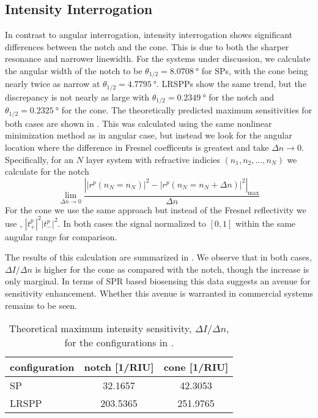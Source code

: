 \subsection{Intensity Interrogation}
In contrast to angular interrogation, intensity interrogation shows
significant differences between the notch and the cone.  This is due to
both the sharper resonance and narrower linewidth.  For the systems under
discussion, we calculate the angular width of the notch to be
$\theta_{1/2}=\SI{8.0708}{\degree}$ for SPs, with the cone being nearly
twice as narrow at $\theta_{1/2}=\SI{4.7795}{\degree}$.  LRSPPs show the same
trend, but the discrepancy is not nearly as large with
$\theta_{1/2}=\SI{0.2349}{\degree}$ for the notch and
$\theta_{1/2}=\SI{0.2325}{\degree}$ for the cone.  The theoretically
predicted maximum
sensitivities for both cases are shown in .  This
was calculated using the same nonlinear minimization method as in angular
case, but instead we look for the angular location where the difference in Fresnel
coefficents is greatest and take $\Delta n \to 0$.  Specifically, for an
$N$ layer system with refractive indicies $(n_1,n_2, \ldots,n_N)$ we
calculate for the notch
\begin{equation}
								\lim_{\Delta n \to 0}\frac{\left||r^p(n_N=n_N)|^2 - |r^p(n_N=n_N + \Delta n)|^2\right|_\mathrm{max}}{\Delta n}
\label{eqn:fresnelsenspertrubation}
\end{equation}
For the cone we use the same approach but instead of the Fresnel
reflectivity we use , $|t^p_+|^2|t^p_-|^2$.  In
both cases the signal normalized to $[0,1]$ within the same angular range
for comparison.

The results of this calculation are summarized in
.  We observe that in both cases, $\Delta I/\Delta
n$ is higher for the cone as compared with the notch, though the increase
is only marginal.  In terms of SPR based biosensing this data suggests an
avenue for sensitivity enhancement.  Whether this avenue is warranted in
commercial systems remains to be seen.
\begin{table}[ht]
\centering
{}
\begin{tabular}{lSS}
\toprule
{configuration} & {notch [1/RIU]} & {cone [1/RIU]} \\
\midrule
SP & 32.1657 & 42.3053 \\
LRSPP & 203.5365 & 251.9765 \\
\bottomrule
\end{tabular}
\caption{Theoretical maximum intensity sensitivity, $\Delta I/\Delta n$,
								for the configurations in . }
\label{tbl:intensitysens}
\end{table}

